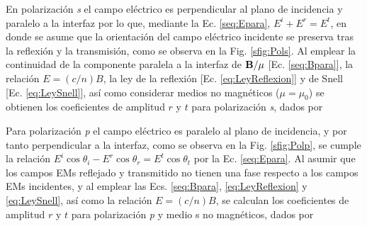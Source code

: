 En polarización \emph{s} el campo eléctrico es perpendicular al plano de incidencia y paralelo a la interfaz por lo que, mediante la Ec. \eqref{seq:Epara}, $E^i + E^r = E^t$, en donde se asume que la orientación del campo eléctrico incidente se preserva tras la reflexión y la transmisión, como se observa en la Fig. \ref{sfig:Pols}. Al emplear la continuidad de la componente paralela a la interfaz de $\vb{B}/\mu$ [Ec. \eqref{seq:Bpara}], la relación $E = (c/n) B$, la ley de la reflexión [Ec. \eqref{eq:LeyReflexion}] y de Snell [Ec. \eqref{eq:LeySnell}], así como considerar medios no magnéticos ($\mu=\mu_0$) se obtienen los coeficientes de amplitud $r$ y $t$ para  polarización \emph{s}, dados por \cite{hecht1998optics}\vspace{-.5em}
%
	\begin{tcolorbox}[title = Coeficientes de amplitud para polarización \emph{s} ]
	\vspace*{-1em}	
	\end{tcolorbox}	 \vspace*{-.75em}\noindent
%
Para polarización \emph{p} el campo eléctrico es paralelo al plano de incidencia, y por tanto perpendicular a la interfaz, como se observa en la Fig. \ref{sfig:Polp}, se cumple la relación $E^i\cos\theta_i-E^r\cos\theta_r = E^t \cos\theta_t$ por la Ec. \eqref{seq:Epara}. Al asumir que los campos EMs reflejado y transmitido no tienen una fase respecto a los campos EMs incidentes, y al emplear las Ecs. \eqref{seq:Bpara},  \eqref{eq:LeyReflexion} y  \eqref{eq:LeySnell}, así como la relación $E = (c/n) B$, se calculan los  coeficientes de amplitud $r$ y $t$ para  polarización \emph{p} y medio s no magnéticos, dados por \cite{hecht1998optics}  \vspace*{-.75em}
	\begin{tcolorbox}[title = Coeficientes de amplitud para polarización \emph{p} ]
	\vspace*{-1em}
	\end{tcolorbox}	

